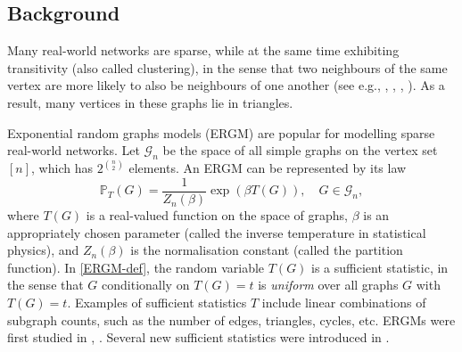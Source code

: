 \documentclass[bj,authoryear,noshowframe]{imsart}
\numberwithin{equation}{section}
\theoremstyle{plain}
\theoremstyle{definition}
\newcommand{\sss}{\scriptscriptstyle}
\newcommand{\out}[1]{}
\begin{document}

\subsection{Background} 

Many real-world networks are sparse, while at the same time exhibiting transitivity (also called clustering), in the sense that two neighbours of the same vertex are more likely to also be neighbours of one another (see e.g., \out{Newman}\cite{newman2009random}, \out{Rapoport}\cite{rapoport1948cycle}, \out{Serrano and Bogu{\~n}a}\cite{serrano2006clustering}, \out{Watts and Strogatz}\cite{watts1998collective}). As a result, many vertices in these graphs lie in triangles.
  
Exponential random graphs models (ERGM) are popular for modelling sparse real-world networks. Let $\mathcal{G}_n$ be the space of all simple graphs on the vertex set $[n]$, which has $2^{n\choose 2}$ elements. An ERGM can be represented by its law
	\begin{equation}
	\label{ERGM-def}
	\mathbb{P}_{\sss T}(G)=\frac{1}{Z_n(\beta)}\exp{\left(\beta T(G)\right)},\quad G\in \mathcal{G}_n,
	\end{equation}	   
where $T(G)$ is a real-valued function on the space of graphs, $\beta$ is an appropriately chosen parameter (called the inverse temperature in statistical physics), and $Z_n(\beta)$ is the normalisation constant (called the partition function). In \eqref{ERGM-def}, the random variable $T(G)$ is a sufficient statistic, in the sense that $G$ conditionally on $T(G)=t$ is {\em uniform} over all graphs $G$ with $T(G)=t$. Examples of sufficient statistics $T$ include linear combinations of subgraph counts, such as the number of edges, triangles, cycles, etc. ERGMs were first studied in \out{Holland and Leinhardt}\cite{holland1981exponential}, \out{Frank and Strauss}\cite{frank1986markov}. Several new sufficient statistics were introduced in \out{Snijders, Pattison, Robins and Handcock}\cite{snijders2006new}. 
\end{document}
